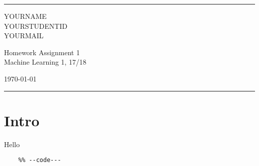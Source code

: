 \documentclass[12pt,a4paper]{article}
\begin{document}
\fancyhead[C]{}
\hrule \medskip %
\begin{minipage}{0.295\textwidth} 
  \raggedright
  \footnotesize
  YOURNAME \hfill\\   
  YOURSTUDENTID\hfill\\
  YOURMAIL
\end{minipage}
\begin{minipage}{0.4\textwidth} 
  \centering 
  \large 
  Homework Assignment 1\\ 
  \normalsize 
  Machine Learning 1, 17/18\\ 
\end{minipage}
\begin{minipage}{0.295\textwidth} 
  \raggedleft
  \today\hfill\\
\end{minipage}
\medskip\hrule 
\bigskip %


\section{Intro}
Hello
  \begin{lstlisting}
    %% --code---
  \end{lstlisting}
\end{document}
